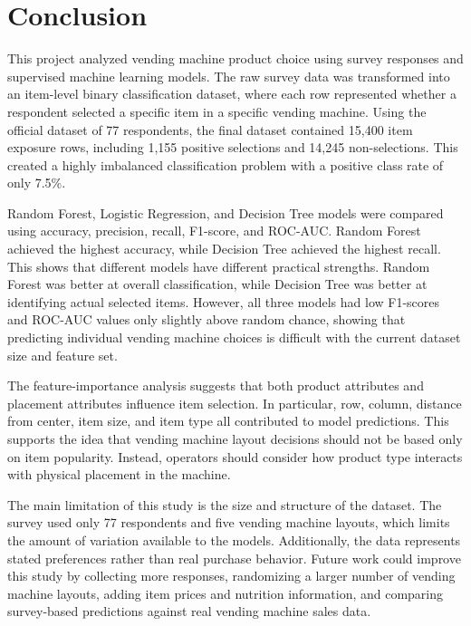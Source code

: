 \documentclass{article}
\begin{document}
\section{Conclusion}

This project analyzed vending machine product choice using survey responses and supervised machine learning models. The raw survey data was transformed into an item-level binary classification dataset, where each row represented whether a respondent selected a specific item in a specific vending machine. Using the official dataset of 77 respondents, the final dataset contained 15,400 item exposure rows, including 1,155 positive selections and 14,245 non-selections. This created a highly imbalanced classification problem with a positive class rate of only 7.5\%.

Random Forest, Logistic Regression, and Decision Tree models were compared using accuracy, precision, recall, F1-score, and ROC-AUC. Random Forest achieved the highest accuracy, while Decision Tree achieved the highest recall. This shows that different models have different practical strengths. Random Forest was better at overall classification, while Decision Tree was better at identifying actual selected items. However, all three models had low F1-scores and ROC-AUC values only slightly above random chance, showing that predicting individual vending machine choices is difficult with the current dataset size and feature set.

The feature-importance analysis suggests that both product attributes and placement attributes influence item selection. In particular, row, column, distance from center, item size, and item type all contributed to model predictions. This supports the idea that vending machine layout decisions should not be based only on item popularity. Instead, operators should consider how product type interacts with physical placement in the machine.

The main limitation of this study is the size and structure of the dataset. The survey used only 77 respondents and five vending machine layouts, which limits the amount of variation available to the models. Additionally, the data represents stated preferences rather than real purchase behavior. Future work could improve this study by collecting more responses, randomizing a larger number of vending machine layouts, adding item prices and nutrition information, and comparing survey-based predictions against real vending machine sales data.
\end{document}
